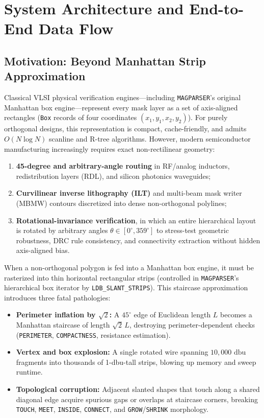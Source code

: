 \chapter{System Architecture and End-to-End Data Flow}
\label{ch:arch}

\section{Motivation: Beyond Manhattan Strip Approximation}

Classical VLSI physical verification engines---including \texttt{MAGPARSER}'s original Manhattan box engine---represent every mask layer as a set of axis-aligned rectangles (\texttt{Box} records of four coordinates $(x_1, y_1, x_2, y_2)$). For purely orthogonal designs, this representation is compact, cache-friendly, and admits $O(N \log N)$ scanline and R-tree algorithms. However, modern semiconductor manufacturing increasingly requires exact non-rectilinear geometry:
\begin{enumerate}
  \item \textbf{45-degree and arbitrary-angle routing} in RF/analog inductors, redistribution layers (RDL), and silicon photonics waveguides;
  \item \textbf{Curvilinear inverse lithography (ILT)} and multi-beam mask writer (MBMW) contours discretized into dense non-orthogonal polylines;
  \item \textbf{Rotational-invariance verification}, in which an entire hierarchical layout is rotated by arbitrary angles $\theta \in [0^\circ, 359^\circ]$ to stress-test geometric robustness, DRC rule consistency, and connectivity extraction without hidden axis-aligned bias.
\end{enumerate}

When a non-orthogonal polygon is fed into a Manhattan box engine, it must be rasterized into thin horizontal rectangular strips (controlled in \texttt{MAGPARSER}'s hierarchical box iterator by \texttt{LDB\_SLANT\_STRIPS}). This staircase approximation introduces three fatal pathologies:
\begin{itemize}
  \item \textbf{Perimeter inflation by $\sqrt{2}$:} A $45^\circ$ edge of Euclidean length $L$ becomes a Manhattan staircase of length $\sqrt{2}\,L$, destroying perimeter-dependent checks (\texttt{PERIMETER}, \texttt{COMPACTNESS}, resistance estimation).
  \item \textbf{Vertex and box explosion:} A single rotated wire spanning $10{,}000\text{ dbu}$ fragments into thousands of 1-dbu-tall strips, blowing up memory and sweep runtime.
  \item \textbf{Topological corruption:} Adjacent slanted shapes that touch along a shared diagonal edge acquire spurious gaps or overlaps at staircase corners, breaking \texttt{TOUCH}, \texttt{MEET}, \texttt{INSIDE}, \texttt{CONNECT}, and \texttt{GROW}/\texttt{SHRINK} morphology.
\end{itemize}

